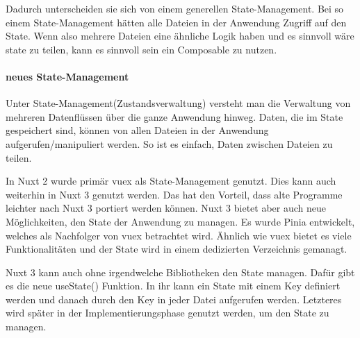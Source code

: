 Dadurch unterscheiden sie sich von einem generellen State-Management. Bei so einem State-Management hätten alle Dateien in der Anwendung Zugriff auf den State. Wenn also mehrere Dateien eine ähnliche Logik haben und es sinnvoll wäre state zu teilen, kann es sinnvoll sein ein Composable zu nutzen.

\paragraph{neues State-Management}

Unter State-Management(Zustandsverwaltung) versteht man die Verwaltung von mehreren Datenflüssen über die ganze Anwendung hinweg. Daten, die im State gespeichert sind, können von allen Dateien in der Anwendung aufgerufen/manipuliert werden. So ist es einfach, Daten zwischen Dateien zu teilen. 

In Nuxt 2 wurde primär vuex als State-Management genutzt. Dies kann auch weiterhin in Nuxt 3 genutzt werden. Das hat den Vorteil, dass alte Programme leichter nach Nuxt 3 portiert werden können. Nuxt 3 bietet aber auch neue Möglichkeiten, den State der Anwendung zu managen. Es wurde Pinia entwickelt, welches als Nachfolger von vuex betrachtet wird. Ähnlich wie vuex bietet es viele Funktionalitäten und der State wird in einem dedizierten Verzeichnis gemanagt. 

Nuxt 3 kann auch ohne irgendwelche Bibliotheken den State managen. Dafür gibt es die neue useState() Funktion. In ihr kann ein State mit einem Key definiert werden und danach durch den Key in jeder Datei aufgerufen werden. Letzteres wird später in der Implementierungsphase genutzt werden, um den State zu managen.